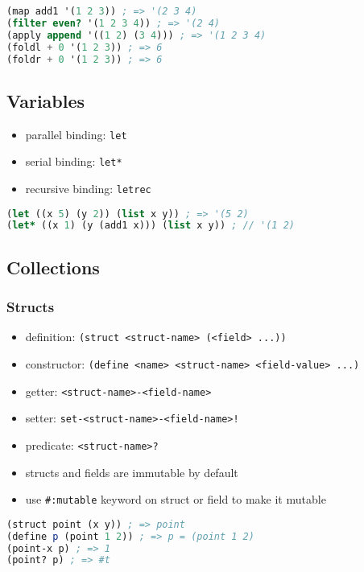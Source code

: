 \documentclass[a4paper,landscape,10pt]{article}
\begin{document}
\begin{multicols*}{2}
  \begin{lstlisting}[language=Scheme]
(map add1 '(1 2 3)) ; => '(2 3 4)
(filter even? '(1 2 3 4)) ; => '(2 4)
(apply append '((1 2) (3 4))) ; => '(1 2 3 4)
(foldl + 0 '(1 2 3)) ; => 6
(foldr + 0 '(1 2 3)) ; => 6
\end{lstlisting}


  \subsection{Variables}

  \begin{itemize}
    \item parallel binding: \texttt{let}
    \item serial binding: \texttt{let*}
    \item recursive binding: \texttt{letrec}
  \end{itemize}

  \begin{lstlisting}[language=Scheme]
(let ((x 5) (y 2)) (list x y)) ; => '(5 2)
(let* ((x 1) (y (add1 x))) (list x y)) ; // '(1 2)
\end{lstlisting}

  \subsection{Collections}

  \subsubsection{Structs}

  \begin{itemize}
    \item definition: \texttt{(struct <struct-name> (<field> ...))}
    \item constructor: \texttt{(define <name> <struct-name> <field-value> ...)}
    \item getter: \texttt{<struct-name>-<field-name>}
    \item setter: \texttt{set-<struct-name>-<field-name>!}
    \item predicate: \texttt{<struct-name>?}
    \item structs and fields are immutable by default
    \item use \texttt{\#:mutable} keyword on struct or field to make it mutable
  \end{itemize}

  \begin{lstlisting}[language=Scheme]
(struct point (x y)) ; => point
(define p (point 1 2)) ; => p = (point 1 2)
(point-x p) ; => 1
(point? p) ; => #t


\end{lstlisting}
\end{multicols*}
\end{document}
